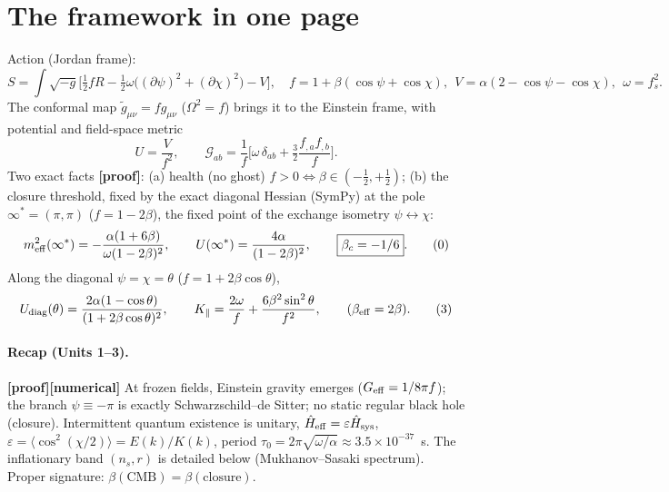 \documentclass[11pt,a4paper]{article}
\newcommand{\st}[1]{\textbf{\textcolor{blue!45!black}{[#1]}}}
\newcommand{\fpole}{\infty^*}
\begin{document}
\section{The framework in one page}
Action (Jordan frame):
\begin{equation}
S=\int\!\sqrt{-g}\Big[\tfrac12 f R-\tfrac12\omega\big((\partial\psi)^2+(\partial\chi)^2\big)-V\Big],\quad
f=1+\beta(\cos\psi+\cos\chi),\ \ V=\alpha(2-\cos\psi-\cos\chi),\ \ \omega=f_s^2. \tag{1}
\end{equation}
The conformal map $\tilde g_{\mu\nu}=f g_{\mu\nu}$ ($\Omega^2=f$) brings it to the Einstein frame, with potential and field-space metric
\begin{equation}
U=\frac{V}{f^2},\qquad \mathcal{G}_{ab}=\frac1f\Big[\omega\,\delta_{ab}+\tfrac32\frac{f_{,a}f_{,b}}{f}\Big]. \tag{2}
\end{equation}
Two exact facts \st{proof}: (a) health (no ghost) $f>0\Leftrightarrow\beta\in(-\tfrac12,+\tfrac12)$; (b) the closure threshold, fixed by the exact diagonal Hessian (SymPy) at the pole $\fpole=(\pi,\pi)$ ($f=1-2\beta$), the fixed point of the exchange isometry $\psi\leftrightarrow\chi$:
\begin{equation}
m^2_{\rm eff}(\fpole)=-\frac{\alpha(1+6\beta)}{\omega(1-2\beta)^2},\qquad U(\fpole)=\frac{4\alpha}{(1-2\beta)^2},\qquad \boxed{\beta_c=-1/6}. \tag{0}
\end{equation}
Along the diagonal $\psi=\chi=\theta$ ($f=1+2\beta\cos\theta$),
\begin{equation}
U_{\rm diag}(\theta)=\frac{2\alpha(1-\cos\theta)}{(1+2\beta\cos\theta)^2},\qquad
K_\parallel=\frac{2\omega}{f}+\frac{6\beta^2\sin^2\theta}{f^2},\qquad(\beta_{\rm eff}=2\beta). \tag{3}
\end{equation}

\paragraph{Recap (Units 1--3).}
\st{proof}\st{numerical} At frozen fields, Einstein gravity emerges ($G_{\rm eff}=1/8\pi f$); the branch $\psi\equiv-\pi$ is exactly Schwarzschild--de Sitter; no static regular black hole (closure). Intermittent quantum existence is unitary, $\hat H_{\rm eff}=\varepsilon\hat H_{\rm sys}$, $\varepsilon=\langle\cos^2(\chi/2)\rangle=E(k)/K(k)$, period $\tau_0=2\pi\sqrt{\omega/\alpha}\approx3.5\times10^{-37}$~s. The inflationary band $(n_s,r)$ is detailed below (Mukhanov--Sasaki spectrum). Proper signature: $\beta(\text{CMB})=\beta(\text{closure})$.
\end{document}
